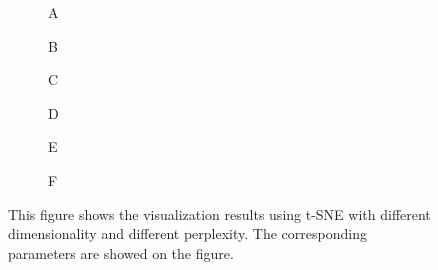 
%


\begin{figure}[!htbp] %
  \centering %

  \begin{subfigure}{0.3\textwidth} %
    \centering
    \fbox{\rule[-.5cm]{0cm}{3cm} \rule[-.5cm]{3cm}{0cm}} %
    \caption{A}
    \label{fig:sub1}
  \end{subfigure}\hfill %
  \begin{subfigure}{0.3\textwidth}
    \centering
    \fbox{\rule[-.5cm]{0cm}{3cm} \rule[-.5cm]{3cm}{0cm}}
    \caption{B}
    \label{fig:sub2}
  \end{subfigure}\hfill
  \begin{subfigure}{0.3\textwidth}
    \centering
    \fbox{\rule[-.5cm]{0cm}{3cm} \rule[-.5cm]{3cm}{0cm}}
    \caption{C}
    \label{fig:sub3}
  \end{subfigure}

  \vspace{1em} %

  \begin{subfigure}{0.3\textwidth}
    \centering
    \fbox{\rule[-.5cm]{0cm}{3cm} \rule[-.5cm]{3cm}{0cm}}
    \caption{D}
    \label{fig:sub4}
  \end{subfigure}\hfill
  \begin{subfigure}{0.3\textwidth}
    \centering
    \fbox{\rule[-.5cm]{0cm}{3cm} \rule[-.5cm]{3cm}{0cm}}
    \caption{E}
    \label{fig:sub5}
  \end{subfigure}\hfill
  \begin{subfigure}{0.3\textwidth}
    \centering
    \fbox{\rule[-.5cm]{0cm}{3cm} \rule[-.5cm]{3cm}{0cm}}
    \caption{F}
    \label{fig:sub6}
  \end{subfigure}

  \caption{This figure shows the visualization results using t-SNE with different dimensionality and different perplexity. The corresponding parameters are showed on the figure.}
  \label{fig:main_figure_grid}
\end{figure}


%